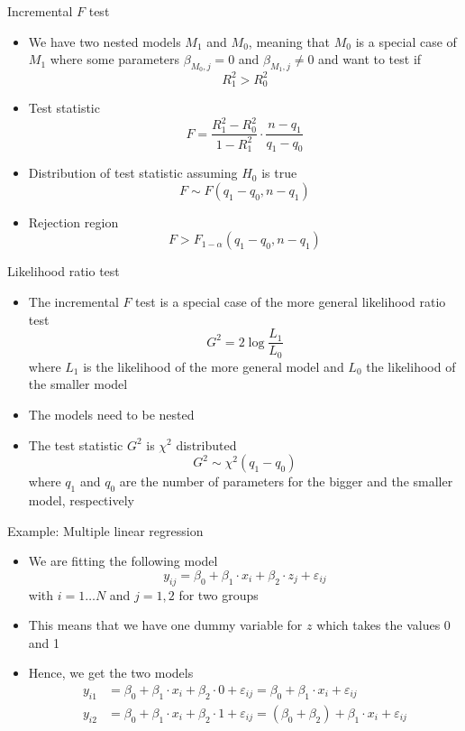 \documentclass[aspectratio=169]{beamer}
\begin{document}
\begin{frame}{Incremental $F$ test}
  \begin{itemize}
    \item We have two nested models $M_1$ and $M_0$, meaning that $M_0$ is a
      special case of $M_1$ where some parameters $\beta_{M_0,j} = 0$ and
      $\beta_{M_1,j} \neq 0$ and want to test if
  \[
    R_1^2 > R_0^2
  \]
  \item Test statistic
    \[
      F = \frac{R^2_1 - R^2_0}{1 - R^2_1} \cdot \frac{n - q_1}{q_1 - q_0}
    \]
  \item Distribution of test statistic assuming $H_0$ is true
    \[
      F \sim F(q_1 - q_0, n - q_1)
    \]
  \item Rejection region
    \[
      F > F_{1-\alpha} (q_1 - q_0, n - q_1)
    \]
  \end{itemize}
\end{frame}

\begin{frame}{Likelihood ratio test}
  \begin{itemize}
    \item The incremental $F$ test is a special case of the more general
      likelihood ratio test
      \[
        G^2 = 2 \log \frac{L_1}{L_0}
      \]
      where $L_1$ is the likelihood of the more general model and $L_0$ the
      likelihood of the smaller model
    \item The models need to be nested
    \item The test statistic $G^2$ is $\chi^2$ distributed
      \[
        G^2 \sim \chi^2(q_1 - q_0)
      \]
      where $q_1$ and $q_0$ are the number of parameters for the bigger and the
      smaller model, respectively
  \end{itemize}
\end{frame}

\begin{frame}[fragile]{Example: Multiple linear regression}
  \begin{itemize}
    \item We are fitting the following model
\[
y_{ij} = \beta_0 + \beta_1 \cdot x_i + \beta_2 \cdot z_j + \varepsilon_{ij}
\]
with $i = 1 \ldots N$ and $j = 1,2$ for two groups
\item This means that we have one dummy variable for $z$ which takes the
  values 0 and 1
\item Hence, we get the two models
\begin{align*}
y_{i1} & = \beta_0 + \beta_1 \cdot x_i + \beta_2\cdot 0 + \varepsilon_{ij}
= \beta_0 + \beta_1 \cdot x_i + \varepsilon_{ij}\\
y_{i2} & = \beta_0 + \beta_1 \cdot x_i + \beta_2\cdot 1 + \varepsilon_{ij}
= (\beta_0 + \beta_2) + \beta_1 \cdot x_i + \varepsilon_{ij}
\end{align*}
  \end{itemize}
\end{frame}
\end{document}
